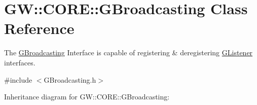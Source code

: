\hypertarget{classGW_1_1CORE_1_1GBroadcasting}{}\section{GW\+:\+:C\+O\+RE\+:\+:G\+Broadcasting Class Reference}
\label{classGW_1_1CORE_1_1GBroadcasting}


The \hyperlink{classGW_1_1CORE_1_1GBroadcasting}{G\+Broadcasting} Interface is capable of registering \& deregistering \hyperlink{classGW_1_1CORE_1_1GListener}{G\+Listener} interfaces.  




{\ttfamily \#include $<$G\+Broadcasting.\+h$>$}



Inheritance diagram for GW\+:\+:C\+O\+RE\+:\+:G\+Broadcasting\+:
